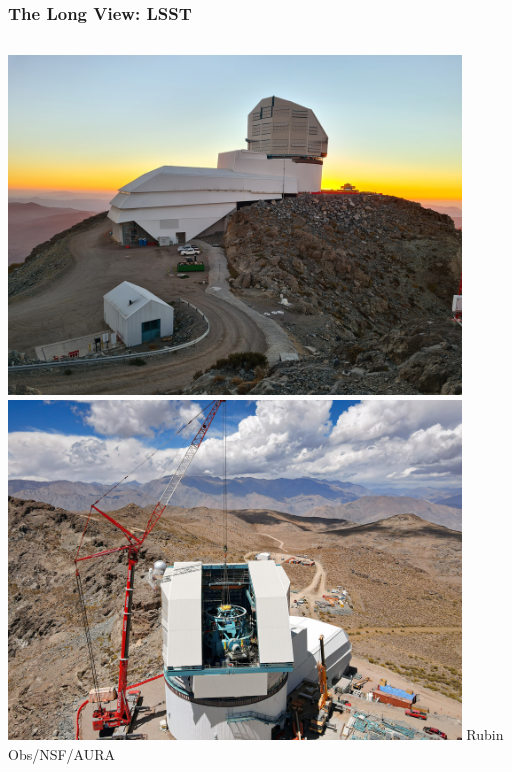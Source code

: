 \documentclass{beamer}
\begin{document}
\frame
{
    \frametitle{The Long View: LSST}

    \begin{columns}

        \begin{column}{0.5\textwidth}    
            \begin{center}
                \includegraphics[width=0.90\textwidth]{telescope-summit-april21.jpg}
                \newline
                \includegraphics[width=0.90\textwidth]{Heavy_Lifting_at_Vera_C._Rubin_Observatory.jpg}
                \newline
                {\tiny Rubin Obs/NSF/AURA}
            \end{center}
        \end{column}


\end{columns}}
\end{document}
